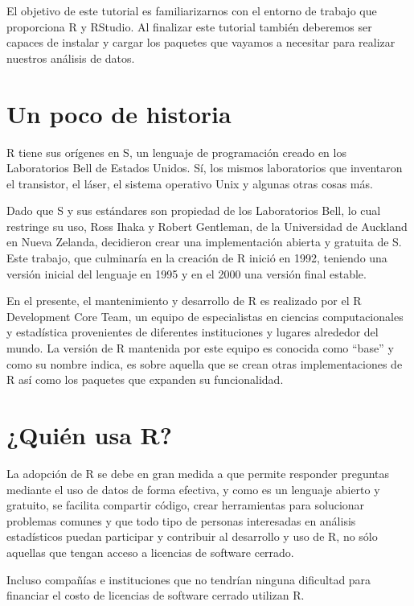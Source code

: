 \documentclass[
]{book}
\begin{document}
El objetivo de este tutorial es familiarizarnos con el entorno de trabajo que proporciona R y RStudio. Al finalizar este tutorial también deberemos ser capaces de instalar y cargar los paquetes que vayamos a necesitar para realizar nuestros análisis de datos.

\hypertarget{un-poco-de-historia}{%
\section{Un poco de historia}\label{un-poco-de-historia}}

R tiene sus orígenes en S, un lenguaje de programación creado en los Laboratorios Bell de Estados Unidos. Sí, los mismos laboratorios que inventaron el transistor, el láser, el sistema operativo Unix y algunas otras cosas más.

Dado que S y sus estándares son propiedad de los Laboratorios Bell, lo cual restringe su uso, Ross Ihaka y Robert Gentleman, de la Universidad de Auckland en Nueva Zelanda, decidieron crear una implementación abierta y gratuita de S. Este trabajo, que culminaría en la creación de R inició en 1992, teniendo una versión inicial del lenguaje en 1995 y en el 2000 una versión final estable.

En el presente, el mantenimiento y desarrollo de R es realizado por el R Development Core Team, un equipo de especialistas en ciencias computacionales y estadística provenientes de diferentes instituciones y lugares alrededor del mundo. La versión de R mantenida por este equipo es conocida como ``base'' y como su nombre indica, es sobre aquella que se crean otras implementaciones de R así como los paquetes que expanden su funcionalidad.

\hypertarget{quiuxe9n-usa-r}{%
\section{¿Quién usa R?}\label{quiuxe9n-usa-r}}

La adopción de R se debe en gran medida a que permite responder preguntas mediante el uso de datos de forma efectiva, y como es un lenguaje abierto y gratuito, se facilita compartir código, crear herramientas para solucionar problemas comunes y que todo tipo de personas interesadas en análisis estadísticos puedan participar y contribuir al desarrollo y uso de R, no sólo aquellas que tengan acceso a licencias de software cerrado.

Incluso compañías e instituciones que no tendrían ninguna dificultad para financiar el costo de licencias de software cerrado utilizan R.
\end{document}
